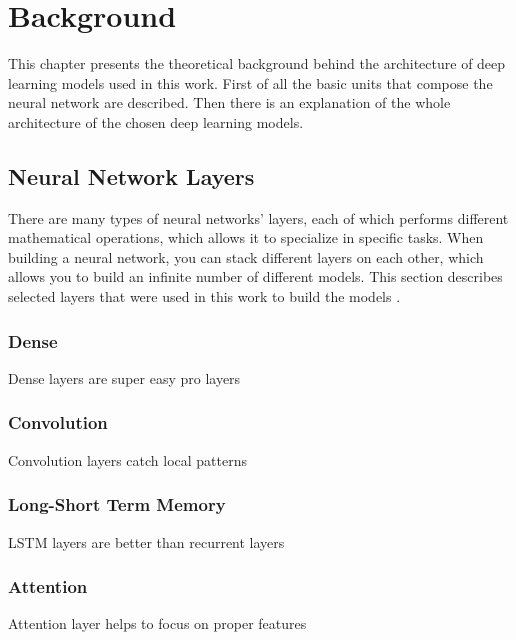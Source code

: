 \chapter{Background}
This chapter presents the theoretical background behind the architecture of deep learning models used in this work. First of all the basic units that compose the neural network are described. Then there is an explanation of the whole architecture of the chosen deep learning models.


\section{Neural Network Layers}
There are many types of neural networks' layers, each of which performs different mathematical operations, which allows it to specialize in specific tasks. When building a neural network, you can stack different layers on each other, which allows you to build an infinite number of different models. This section describes selected layers that were used in this work to build the models .


\subsection{Dense}
Dense layers are super easy pro layers


\subsection{Convolution}
Convolution layers catch local patterns

\subsection{Long-Short Term Memory}
LSTM layers are better than recurrent layers

\subsection{Attention}
Attention layer helps to focus on proper features


